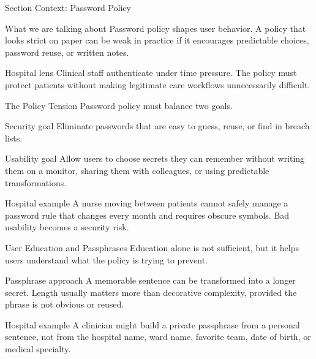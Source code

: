 \documentclass[presentation]{beamer}
\begin{document}
\begin{frame}[c]{Section Context: Password Policy}
\begin{block}{What we are talking about}
Password policy shapes user behavior. A policy that looks strict on paper can be weak in practice
if it encourages predictable choices, password reuse, or written notes.
\end{block}

\begin{exampleblock}{Hospital lens}
Clinical staff authenticate under time pressure. The policy must protect patients without making
legitimate care workflows unnecessarily difficult.
\end{exampleblock}
\end{frame}

\begin{frame}[c]{The Policy Tension}
  Password policy must balance two goals.

  \begin{block}{Security goal}
    Eliminate passwords that are easy to guess, reuse, or find in breach lists.
  \end{block}

  \begin{block}{Usability goal}
    Allow users to choose secrets they can remember without writing them on a monitor, sharing them with colleagues, or using predictable transformations.
  \end{block}

  \begin{exampleblock}{Hospital example}
    A nurse moving between patients cannot safely manage a password rule that changes every month and requires obscure symbols. Bad usability becomes a security risk.
  \end{exampleblock}
\end{frame}

\begin{frame}[c]{User Education and Passphrases}
  Education alone is not sufficient, but it helps users understand what the policy is trying to prevent.

  \begin{block}{Passphrase approach}
    A memorable sentence can be transformed into a longer secret. Length usually matters more than decorative complexity, provided the phrase is not obvious or reused.
  \end{block}

  \begin{exampleblock}{Hospital example}
    A clinician might build a private passphrase from a personal sentence, not from the hospital name, ward name, favorite team, date of birth, or medical specialty.
  \end{exampleblock}
\end{frame}
\end{document}
